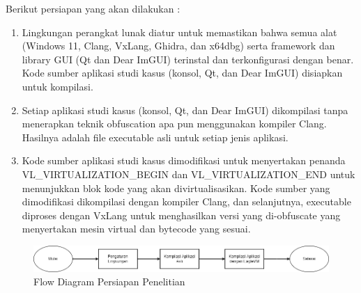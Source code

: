 Berikut persiapan yang akan dilakukan :
\begin{enumerate}
	\item {} Lingkungan perangkat lunak diatur untuk memastikan bahwa semua alat (Windows 11, Clang, VxLang, Ghidra, dan x64dbg) serta framework dan library GUI (Qt dan Dear ImGUI) terinstal dan terkonfigurasi dengan benar. Kode sumber aplikasi studi kasus (konsol, Qt, dan Dear ImGUI) disiapkan untuk kompilasi.
	\item {} Setiap aplikasi studi kasus (konsol, Qt, dan Dear ImGUI) dikompilasi tanpa menerapkan teknik obfuscation apa pun menggunakan kompiler Clang. Hasilnya adalah file executable asli untuk setiap jenis aplikasi.
	\item {} Kode sumber aplikasi studi kasus dimodifikasi untuk menyertakan penanda VL\_VIRTUALIZATION\_BEGIN dan VL\_VIRTUALIZATION\_END untuk menunjukkan blok kode yang akan divirtualisasikan. Kode sumber yang dimodifikasi dikompilasi dengan kompiler Clang, dan selanjutnya, executable diproses dengan VxLang untuk menghasilkan versi yang di-obfuscate yang menyertakan mesin virtual dan bytecode yang sesuai.
\end{enumerate}

\begin{figure}
	\centering
	\includegraphics[width=1\textwidth]
	{assets/pics/Persiapan.png}
	\caption{Flow Diagram Persiapan Penelitian}
\end{figure}

